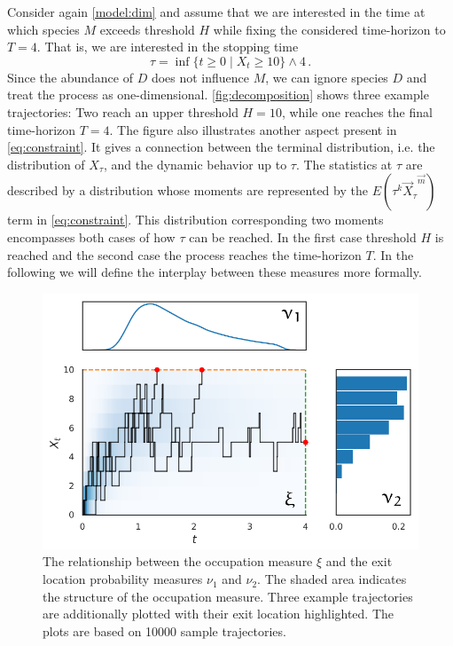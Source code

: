\begin{example}
	Consider again \autoref{model:dim} and assume that we are interested in the
time at which species $M$ exceeds  threshold $H$ while fixing the considered time-horizon to
$T=4$. That is, we are interested in the stopping time
\[
	\tau=\inf\{t\geq 0\mid X_t\geq 10\}\land 4\,.
\]
Since the abundance of $D$ does not influence $M$, we can ignore
species $D$ and treat the process as one-dimensional.
\autoref{fig:decomposition} shows three example trajectories:
Two reach an upper threshold $H=10$, while one reaches the final time-horizon $T=4$.
The figure also illustrates another aspect present in \eqref{eq:constraint}.
It gives a connection between the terminal distribution, i.e. the distribution of $X_{\tau}$,
and the dynamic behavior up to $\tau$.
The statistics at $\tau$ are described by a distribution whose %
moments are represented by the $E(\tau^k{\vec{X}_{\tau}}^{\vec{m}})$ term in \eqref{eq:constraint}.
This distribution corresponding two moments encompasses both cases of how
$\tau$ can be reached. In the first case threshold $H$ is reached and the second case the process reaches the time-horizon $T$.
In the following we will define the interplay between these measures more formally.
\begin{figure}[htb]
    \centering
    \includegraphics[scale=.8]{gfx/decomp1.pdf}
	\caption[Occupation measure $\xi$ and
	exit location probability measures $\nu_1$ and $\nu_2$]{The relationship between the occupation measure $\xi$ and the
    exit location probability measures $\nu_1$ and $\nu_2$. The shaded area indicates
    the structure of the occupation measure. Three example trajectories are
    additionally plotted with
	their exit location highlighted. The plots are based on \num{10000} sample trajectories.}
    \label{fig:decomposition}
\end{figure}
\end{example}


